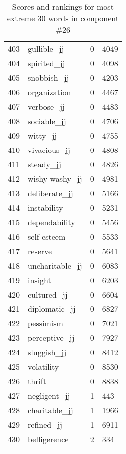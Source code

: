 \begin{longtable}[!htbp]{| rlr@{.}l |}
    403 & gullible\_jj & 0 & 4049 \\
    404 & spirited\_jj & 0 & 4098 \\
    405 & snobbish\_jj & 0 & 4203 \\
    406 & organization & 0 & 4467 \\
    407 & verbose\_jj & 0 & 4483 \\
    408 & sociable\_jj & 0 & 4706 \\
    409 & witty\_jj & 0 & 4755 \\
    410 & vivacious\_jj & 0 & 4808 \\
    411 & steady\_jj & 0 & 4826 \\
    412 & wishy-washy\_jj & 0 & 4981 \\
    413 & deliberate\_jj & 0 & 5166 \\
    414 & instability & 0 & 5231 \\
    415 & dependability & 0 & 5456 \\
    416 & self-esteem & 0 & 5533 \\
    417 & reserve & 0 & 5641 \\
    418 & uncharitable\_jj & 0 & 6083 \\
    419 & insight & 0 & 6203 \\
    420 & cultured\_jj & 0 & 6604 \\
    421 & diplomatic\_jj & 0 & 6827 \\
    422 & pessimism & 0 & 7021 \\
    423 & perceptive\_jj & 0 & 7927 \\
    424 & sluggish\_jj & 0 & 8412 \\
    425 & volatility & 0 & 8530 \\
    426 & thrift & 0 & 8838 \\
    427 & negligent\_jj & 1 & 443 \\
    428 & charitable\_jj & 1 & 1966 \\
    429 & refined\_jj & 1 & 6911 \\
    430 & belligerence & 2 & 334 \\
    \hline
    \caption{Scores and rankings for most extreme 30 words in component \#26} \\
\end{longtable}
